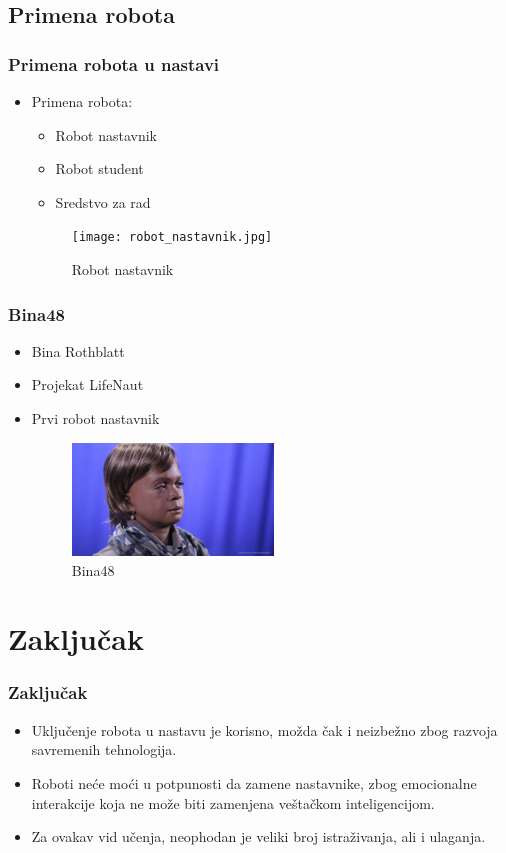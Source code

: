 \documentclass[10pt]{beamer}
\begin{document}
\subsection{Primena robota}
\begin{frame}[fragile]\frametitle{Primena robota u nastavi}

\begin{itemize}
    \item Primena robota:
    \begin{itemize}
        \item Robot nastavnik
        \item Robot student
        \item Sredstvo za rad
    \end{itemize}
    \begin{figure}[h!]
        \centering\texttt{[image: robot\_nastavnik.jpg]} 
        \caption{Robot nastavnik}
        \label{fig:robotnastavnik}
        \end{figure}
    
\end{itemize}
\end{frame}

\begin{frame}[fragile]\frametitle{Bina48}
	\begin{itemize}	
        \item Bina Rothblatt
        \item Projekat LifeNaut
        \item Prvi robot nastavnik
        \begin{figure}[h!]
        \centering\includegraphics[height=3cm]{Bina48.jpg} 
        \caption{Bina48}
        \label{fig:bina48}
        \end{figure}
 \end{itemize}
\end{frame}

\section{Zaključak}
\begin{frame}[fragile]\frametitle{Zaključak}
	\begin{itemize}	
        \item Uključenje robota u nastavu je korisno, možda čak i neizbežno zbog razvoja savremenih tehnologija.
        \item Roboti neće moći u potpunosti da zamene nastavnike, zbog emocionalne interakcije koja ne može biti zamenjena veštačkom inteligencijom.
        \item Za ovakav vid učenja, neophodan je veliki broj istraživanja, ali i ulaganja.
 \end{itemize}
\end{frame}
\end{document}
